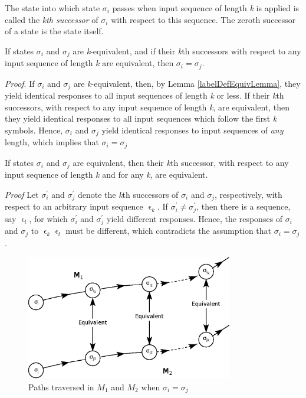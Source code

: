 \documentclass[a4paper]{report}
\begin{document}
    The state into which state $ \sigma_i $ passes when input sequence of length \emph{k} is applied is called the \emph{kth successor} of $ \sigma_i $ with respect to this sequence. The zeroth successor of a state is the state itself.

    \theorem If states $ \sigma_i $ and $ \sigma_j $ are \emph{k}-equivalent, and if their \emph{k}th successors with respect to any input sequence of length \emph{k} are equivalent, then $\sigma_i = \sigma_j$.

    \emph{Proof}. If $\sigma_i$ and $\sigma_j$ are \emph{k}-equivalent, then, by Lemma \ref{labelDefEquivLemma}, they yield identical responses to all input sequences of length \emph{k} or less. If their \emph{k}th successors, with respect to any input sequence of length \emph{k}, are equivalent, then they yield identical responses to all input sequences which follow the first \emph{k} symbols. Hence, $ \sigma_i $ and $ \sigma_j $ yield identical responses to input sequences of \emph{any} length, which implies that $\sigma_i = \sigma_j$

    \theorem \label{labelBelowKEquiv} If states $ \sigma_i $ and $ \sigma_j $ are equivalent, then their \emph{k}th successor, with respect to any input sequence of length \emph{k} and for any \emph{k}, are equivalent.

    \emph{Proof} Let $ \sigma^{'}_i$ and  $ \sigma^{'}_j$ denote the \emph{k}th successors of $\sigma_i$ and $\sigma_j$, respectively, with respect to an arbitrary input sequence $\upvarepsilon_k$. If $ \sigma^{'}_i \neq \sigma^{'}_j $, then there is a sequence, say $\upvarepsilon_l$, for which $ \sigma^{'}_i $ and $ \sigma^{'}_j $ yield different responses. Hence, the responses of $\sigma_i$ and $\sigma_j$ to $\upvarepsilon_k\upvarepsilon_l$ must be different, which contradicts the assumption that $ \sigma_i = \sigma_j $.

    \begin{figure}[!t]
        \centering
        \includegraphics[width=256pt,clip]{images/eps/pathsThroughM1AndM2}
        \caption{Paths traversed in $M_1$ and $M_2$ when $\sigma_i = \sigma_j$ }
        \label{fig:kEquivalenceTraversal}
    \end{figure}
\end{document}
